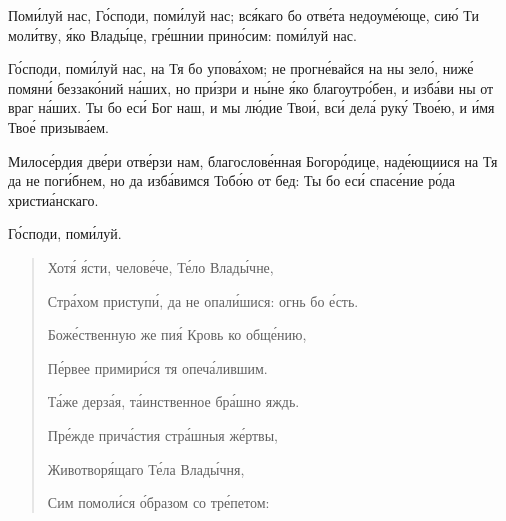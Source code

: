 \begin{mymulticols}
Пом\'{и}луй нас, Г\'{о}споди, пом\'{и}луй нас; вс\'{я}каго бо отв\'{е}та недоум\'{е}юще, си\'{ю} Ти мол\'{и}тву, \'{я}ко Влад\'{ы}це, гр\'{е}шнии прин\'{о}сим: пом\'{и}луй нас.

\slava

Г\'{о}споди, пом\'{и}луй нас, на Тя бо упов\'{а}хом; не прогн\'{е}вайся на ны зел\'{о}, ниж\'{е} помян\'{и} беззак\'{о}ний н\'{а}ших, но пр\'{и}зри и н\'{ы}не \'{я}ко благоутр\'{о}бен, и изб\'{а}ви ны от враг н\'{а}ших. Ты бо ес\'{и} Бог наш, и мы л\'{ю}дие Тво\'{и}, вс\'{и} дел\'{а} рук\'{у} Тво\'{е}ю, и \'{и}мя Тво\'{е} призыв\'{а}ем.

\inyne

Милос\'{е}рдия дв\'{е}ри отв\'{е}рзи нам, благослов\'{е}нная Богор\'{о}дице, над\'{е}ющиися на Тя да не пог\'{и}бнем, но да изб\'{а}вимся Тоб\'{о}ю от бед: Ты бо ес\'{и} спас\'{е}ние р\'{о}да христи\'{а}нскаго.

Г\'{о}споди, пом\'{и}луй. 


\begin{verse}
{\small Хот\'{я} \'{я}сти, челов\'{е}че, Т\'{е}ло Влад\'{ы}чне,

Стр\'{а}хом приступ\'{и}, да не опал\'{и}шися: огнь бо \'{е}сть.

Бож\'{е}ственную же пи\'{я} Кровь ко общ\'{е}нию,

П\'{е}рвее примир\'{и}ся тя опеч\'{а}лившим.

Т\'{а}же дерз\'{а}я, т\'{а}инственное бр\'{а}шно яждь.

Пр\'{е}жде прич\'{а}стия стр\'{а}шныя ж\'{е}ртвы,

Животвор\'{я}щаго Т\'{е}ла Влад\'{ы}чня,

Сим помол\'{и}ся \'{о}бразом со тр\'{е}петом:}

\end{verse}



\end{mymulticols}
